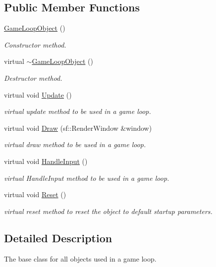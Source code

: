 \subsection*{Public Member Functions}
\begin{DoxyCompactItemize}
\item 
\hyperlink{class_game_loop_object_aa5e0d6adf075fe106b7da8c1c6b19d6b}{Game\+Loop\+Object} ()
\begin{DoxyCompactList}\small\item\em Constructor method. \end{DoxyCompactList}\item 
virtual \hyperlink{class_game_loop_object_afec283bec43cc40dc49c54a7641b4915}{$\sim$\+Game\+Loop\+Object} ()
\begin{DoxyCompactList}\small\item\em Destructor method. \end{DoxyCompactList}\item 
virtual void \hyperlink{class_game_loop_object_ae36a15981f1dd3f3bea6050473490349}{Update} ()
\begin{DoxyCompactList}\small\item\em virtual update method to be used in a game loop. \end{DoxyCompactList}\item 
virtual void \hyperlink{class_game_loop_object_a0572a88e5b98fa8a41078260d152202d}{Draw} (sf\+::\+Render\+Window \&window)
\begin{DoxyCompactList}\small\item\em virtual draw method to be used in a game loop. \end{DoxyCompactList}\item 
virtual void \hyperlink{class_game_loop_object_aecab111d504b7f4590045ca7c83a36de}{Handle\+Input} ()
\begin{DoxyCompactList}\small\item\em virtual Handle\+Input method to be used in a game loop. \end{DoxyCompactList}\item 
virtual void \hyperlink{class_game_loop_object_af61e973be170cb9437a5b7d9ecd6ef53}{Reset} ()
\begin{DoxyCompactList}\small\item\em virtual reset method to reset the object to default startup parameters. \end{DoxyCompactList}\end{DoxyCompactItemize}


\subsection{Detailed Description}
The base class for all objects used in a game loop. 

